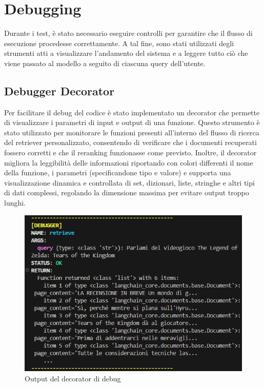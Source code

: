 \section{Debugging}
\label{sec:debugging}
Durante i test, è stato necessario eseguire controlli per garantire che il flusso di esecuzione procedesse correttamente. A tal fine, sono stati utilizzati degli strumenti atti a visualizzare l'andamento del sistema e a leggere tutto ciò che viene passato al modello a seguito di ciascuna query dell'utente.

\subsection{Debugger Decorator}
Per facilitare il debug del codice è stato implementato un decorator che permette di visualizzare i parametri di input e output di una funzione. Questo strumento è stato utilizzato per monitorare le funzioni presenti all'interno del flusso di ricerca del retriever personalizzato, consentendo di verificare che i documenti recuperati fossero corretti e che il reranking funzionasse come previsto. Inoltre, il decorator migliora la leggibilità delle informazioni riportando con colori differenti il nome della funzione, i parametri (specificandone tipo e valore) e supporta una visualizzazione dinamica e controllata di set, dizionari, liste, stringhe e altri tipi di dati complessi, regolando la dimensione massima per evitare output troppo lunghi.
\begin{figure}[!t]
    \centering
    \includegraphics[width=\textwidth]{Images/cap5/debug.PNG}
    \caption{Output del decorator di debug}
    \label{fig:debugger}
\end{figure}

